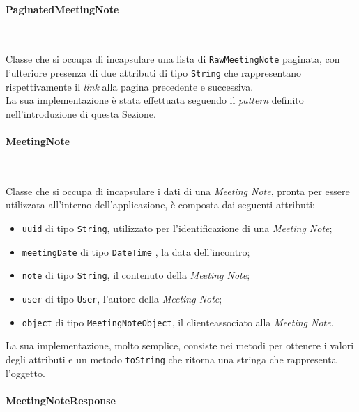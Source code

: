 \paragraph*{PaginatedMeetingNote} ~ \\
\label{par:paginated-meeting-note}

\noindent Classe che si occupa di incapsulare una lista di \lstinline{RawMeetingNote} paginata, con l'ulteriore presenza di due attributi di tipo \lstinline{String} che rappresentano rispettivamente il \emph{link} alla pagina precedente e successiva.\\
La sua implementazione è stata effettuata seguendo il \emph{pattern} definito nell'introduzione di questa Sezione.

\paragraph*{MeetingNote} ~ \\
\label{par:meeting-note}

\noindent Classe che si occupa di incapsulare i dati di una \emph{Meeting Note}, pronta per essere utilizzata all'interno dell'applicazione, è composta dai seguenti attributi:
\begin{itemize}
    \item \lstinline{uuid} di tipo \lstinline{String}, utilizzato per l'identificazione di una \emph{Meeting Note};
    \item \lstinline{meetingDate} di tipo \lstinline{DateTime} \cite{site:date-time}, la data dell'incontro;
    \item \lstinline{note} di tipo \lstinline{String}, il contenuto della \emph{Meeting Note};
    \item \lstinline{user} di tipo \lstinline{User}, l'autore della \emph{Meeting Note};
    \item \lstinline{object} di tipo \lstinline{MeetingNoteObject}, il \gls{cliente}\glsoccur associato alla \emph{Meeting Note}.
\end{itemize}
La sua implementazione, molto semplice, consiste nei metodi per ottenere i valori degli attributi e un metodo \lstinline{toString} che ritorna una stringa che rappresenta l'oggetto.

\paragraph*{MeetingNoteResponse} ~ \\
\label{par:meeting-note-response}

